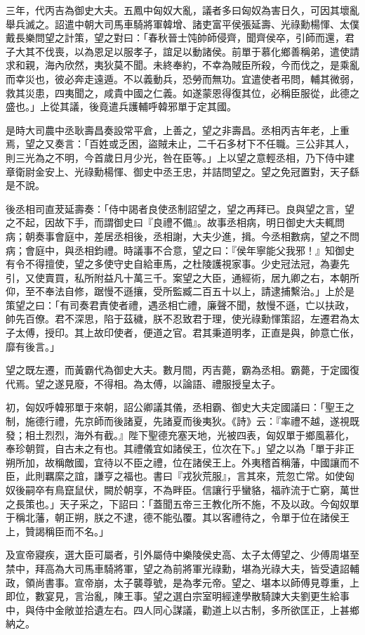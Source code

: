 \begin{pinyinscope}
三年，代丙吉為御史大夫。五鳳中匈奴大亂，議者多曰匈奴為害日久，可因其壞亂舉兵滅之。詔遣中朝大司馬車騎將軍韓增、諸吏富平侯張延壽、光祿勳楊惲、太僕戴長樂問望之計策，望之對曰：「春秋晉士饨帥師侵齊，聞齊侯卒，引師而還，君子大其不伐喪，以為恩足以服孝子，誼足以動諸侯。前單于慕化鄉善稱弟，遣使請求和親，海內欣然，夷狄莫不聞。未終奉約，不幸為賊臣所殺，今而伐之，是乘亂而幸災也，彼必奔走遠遁。不以義動兵，恐勞而無功。宜遣使者弔問，輔其微弱，救其災患，四夷聞之，咸貴中國之仁義。如遂蒙恩得復其位，必稱臣服從，此德之盛也。」上從其議，後竟遣兵護輔呼韓邪單于定其國。

是時大司農中丞耿壽昌奏設常平倉，上善之，望之非壽昌。丞相丙吉年老，上重焉，望之又奏言：「百姓或乏困，盜賊未止，二千石多材下不任職。三公非其人，則三光為之不明，今首歲日月少光，咎在臣等。」上以望之意輕丞相，乃下侍中建章衛尉金安上、光祿勳楊惲、御史中丞王忠，并詰問望之。望之免冠置對，天子繇是不說。

後丞相司直茇延壽奏：「侍中謁者良使丞制詔望之，望之再拜已。良與望之言，望之不起，因故下手，而謂御史曰『良禮不備』。故事丞相病，明日御史大夫輒問病；朝奏事會庭中，差居丞相後，丞相謝，大夫少進，揖。今丞相數病，望之不問病；會庭中，與丞相鈞禮。時議事不合意，望之曰：『侯年寧能父我邪！』知御史有令不得擅使，望之多使守史自給車馬，之杜陵護視家事。少史冠法冠，為妻先引，又使賣買，私所附益凡十萬三千。案望之大臣，通經術，居九卿之右，本朝所仰，至不奉法自修，踞慢不遜攘，受所監臧二百五十以上，請逮捕繫治。」上於是策望之曰：「有司奏君責使者禮，遇丞相亡禮，廉聲不聞，敖慢不遜，亡以扶政，帥先百僚。君不深思，陷于茲穢，朕不忍致君于理，使光祿勳惲策詔，左遷君為太子太傅，授印。其上故印使者，便道之官。君其秉道明孝，正直是與，帥意亡伥，靡有後言。」

望之既左遷，而黃霸代為御史大夫。數月間，丙吉薨，霸為丞相。霸薨，于定國復代焉。望之遂見廢，不得相。為太傅，以論語、禮服授皇太子。

初，匈奴呼韓邪單于來朝，詔公卿議其儀，丞相霸、御史大夫定國議曰：「聖王之制，施德行禮，先京師而後諸夏，先諸夏而後夷狄。《詩》云：『率禮不越，遂視既發；相土烈烈，海外有截。』陛下聖德充塞天地，光被四表，匈奴單于鄉風慕化，奉珍朝賀，自古未之有也。其禮儀宜如諸侯王，位次在下。」望之以為「單于非正朔所加，故稱敵國，宜待以不臣之禮，位在諸侯王上。外夷稽首稱藩，中國讓而不臣，此則羈縻之誼，謙亨之福也。書曰『戎狄荒服』，言其來，荒忽亡常。如使匈奴後嗣卒有鳥竄鼠伏，闕於朝享，不為畔臣。信讓行乎蠻貉，福祚流于亡窮，萬世之長策也。」天子采之，下詔曰：「蓋聞五帝三王教化所不施，不及以政。今匈奴單于稱北藩，朝正朔，朕之不逮，德不能弘覆。其以客禮待之，令單于位在諸侯王上，贊謁稱臣而不名。」

及宣帝寢疾，選大臣可屬者，引外屬侍中樂陵侯史高、太子太傅望之、少傅周堪至禁中，拜高為大司馬車騎將軍，望之為前將軍光祿勳，堪為光祿大夫，皆受遺詔輔政，領尚書事。宣帝崩，太子襲尊號，是為孝元帝。望之、堪本以師傅見尊重，上即位，數宴見，言治亂，陳王事。望之選白宗室明經達學散騎諫大夫劉更生給事中，與侍中金敞並拾遺左右。四人同心謀議，勸道上以古制，多所欲匡正，上甚鄉納之。


\end{pinyinscope}
